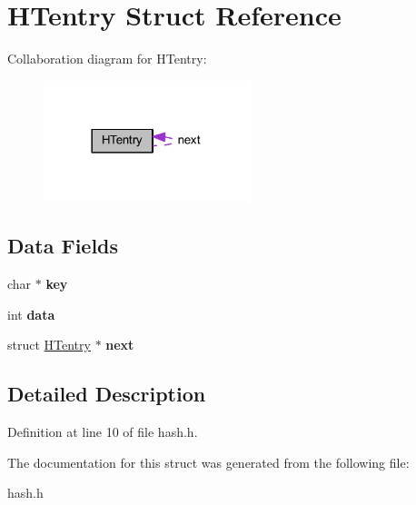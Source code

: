 \hypertarget{struct_h_tentry}{}\section{H\+Tentry Struct Reference}
\label{struct_h_tentry}


Collaboration diagram for H\+Tentry\+:
\nopagebreak
\begin{figure}[H]
\begin{center}
\leavevmode
\includegraphics[width=170pt]{d0/de1/struct_h_tentry__coll__graph}
\end{center}
\end{figure}
\subsection*{Data Fields}
\begin{DoxyCompactItemize}
\item 
\mbox{\label{struct_h_tentry_a5892a9181e6a332f84d27aecd41dcd12}} 
char $\ast$ {\bfseries key}
\item 
\mbox{\label{struct_h_tentry_a9eab91667db4d35c7231dcddf7b89a76}} 
int {\bfseries data}
\item 
\mbox{\label{struct_h_tentry_a0a007ac57114de7444aa086249eb4a6d}} 
struct \hyperlink{struct_h_tentry}{H\+Tentry} $\ast$ {\bfseries next}
\end{DoxyCompactItemize}


\subsection{Detailed Description}


Definition at line 10 of file hash.\+h.



The documentation for this struct was generated from the following file\+:\begin{DoxyCompactItemize}
\item 
hash.\+h\end{DoxyCompactItemize}
